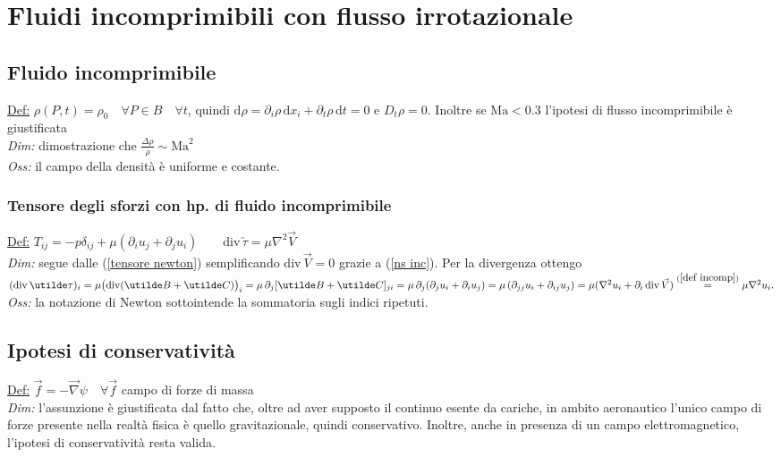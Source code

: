 \documentclass[11pt,a4paper]{report}
\newcommand{\de}{\mathrm d}
\begin{document}
\chapter{Fluidi incomprimibili con flusso irrotazionale}
	\section{Fluido incomprimibile} \label{def incomp}
	\underline{Def:} $\rho(P,t)=\rho_0\quad\forall P\in B\quad\forall t$, quindi $\de \rho=\partial_i\rho\,\de x_i+\partial_t\rho\,\de t=0$ e $D_t\rho=0$. Inoltre se $\mathrm{Ma}<0.3$ l'ipotesi di flusso incomprimibile è giustificata\\
	\textit{Dim:} dimostrazione che $\frac{\Delta\rho}{\rho}\sim\mathrm{Ma}^2$\\
	\textit{Oss:} il campo della densità è uniforme e costante.
		\subsection{Tensore degli sforzi con hp. di fluido incomprimibile}	\label{tens incomp}
		\underline{Def:} $T_{ij}=-p\delta_{ij}+\mu(\partial_i u_j+\partial_j u_i)\qquad\mathrm{div}\,\utilde\tau=\mu\nabla^2\vec V$\\
		\textit{Dim:} segue dalle (\ref{tensore newton}) semplificando $\mathrm{div}\,\vec V=0$ grazie a (\ref{ns inc}). Per la divergenza ottengo $(\mathrm{div}\,\utilde\tau)_i=\mu\big(\mathrm{div}(\utilde B+\utilde C)\big)_i=\mu\,\partial_j[\utilde B+\utilde C]_{ji}=\mu\,\partial_j(\partial_ju_i+\partial_iu_j)=\mu\,(\partial_{jj}u_i+\partial_{ij}u_j)=\mu(\nabla^2u_i+\partial_i\,\mathrm{div}\,\vec V)\overset{(\ref{def incomp})}{=}\mu\nabla^2 u_i.$\\
		\textit{Oss:} la notazione di Newton sottointende la sommatoria sugli indici ripetuti.
		
	\section{Ipotesi di conservatività}
	\underline{Def:} $\vec f=-\vec\nabla\psi\quad\forall\vec f$ campo di forze di massa\\
	\textit{Dim:} l'assunzione è giustificata dal fatto che, oltre ad aver supposto il continuo esente da cariche, in ambito aeronautico l'unico campo di forze presente nella realtà fisica è quello gravitazionale, quindi conservativo. Inoltre, anche in presenza di un campo elettromagnetico, l'ipotesi di conservatività resta valida.\\\mbox{}\qquad
	
\end{document}

